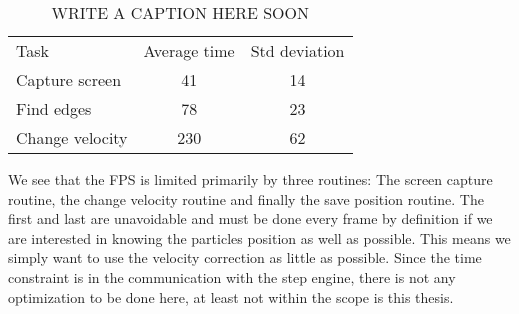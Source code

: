 \begin{table}[H]
 \begin{tabular}{l | c | c } 
 Task  			&  Average time & Std deviation \\
 Capture screen & 41 			& 14 \\
 Find edges 	& 78			& 23 \\
 Change velocity& 230			& 62 \\
 \end{tabular}
 \caption{WRITE A CAPTION HERE SOON}
 \label{tab:benchmarks}
\end{table}

We see that the FPS is limited primarily by three routines: The screen capture routine, the change velocity routine and finally the save position routine. The first and last are unavoidable and must be done every frame by definition if we are interested in knowing the particles position as well as possible. This means we simply want to use the velocity correction as little as possible. Since the time constraint is in the communication with the step engine, there is not any optimization to be done here, at least not within the scope is this thesis. 
